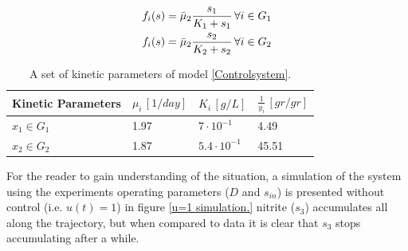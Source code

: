 \documentclass[3p,times]{article}
\begin{document}
\begin{align}
\label{monod} f_i(s) &= \bar{\mu}_2 \dfrac{s_1}{K_1 +s_1} \, \forall i \in G_1 \\
\notag  f_i(s) &= \bar{\mu}_2 \dfrac{s_2}{K_2 +s_2 } \, \forall i \in G_2
\end{align}

\begin{table}[ht]
	\centering
	\begin{tabular}{|l|l|l|l|}
		\hline
		Kinetic Parameters & $\mu_i\,[1/day]$ & $K_i\,[g/L]$ & $\frac{1}{y_i} \, [gr/gr]$ \\ \hline
		$x_1 \in G_1$ & 1.97  & $7\cdot 10^{-1}$ & 4.49  \\ \hline
		$x_2\in G_2$ & 1.87 & $5.4\cdot 10^{-1}$ &  45.51 \\ \hline
	\end{tabular}	
	\caption{A set of kinetic parameters of model \eqref{Controlsystem}.}
	\label{kinetic_parameters_application}
\end{table}
For the reader to gain understanding of the situation, a simulation of the system using the experiments operating parameters ($D$ and $s_{in}$) is presented without control (i.e. $u(t)= 1$) in  figure \ref{u=1 simulation.} nitrite ($s_3$) accumulates all along the trajectory, but when compared to data it is clear that $s_3$ stops accumulating after a while. 
\end{document}
